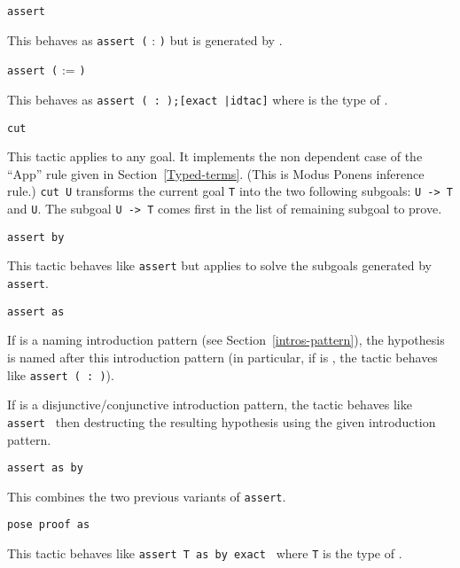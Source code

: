 \begin{Variants}

\item{\tt assert {\form}}
  
  This behaves as {\tt assert (} {\ident} : {\form} {\tt )} but
  {\ident} is generated by {\Coq}.

\item{\tt assert (} {\ident} := {\term} {\tt )}
  
  This behaves as {\tt assert ({\ident} : {\type});[exact
    {\term}|idtac]} where {\type} is the type of {\term}.

\item {\tt cut {\form}} 
  
  This tactic applies to any goal. It implements the non dependent
  case of the ``App'' rule given in
  Section~\ref{Typed-terms}. (This is Modus Ponens inference rule.)
  {\tt cut U} transforms the current goal \texttt{T} into the two
  following subgoals: {\tt U -> T} and \texttt{U}.  The subgoal {\tt U
    -> T} comes first in the list of remaining subgoal to prove.

\item \texttt{assert {\form} by {\tac}}
  
  This tactic behaves like \texttt{assert} but applies {\tac}
  to solve the subgoals generated by \texttt{assert}.

\item \texttt{assert {\form} as {\intropattern}}

  If {\intropattern} is a naming introduction pattern (see
  Section~\ref{intros-pattern}), the hypothesis is named after this
  introduction pattern (in particular, if {\intropattern} is {\ident},
  the tactic behaves like \texttt{assert ({\ident} : {\form})}).

  If {\intropattern} is a disjunctive/conjunctive introduction
  pattern, the tactic behaves like \texttt{assert {\form}} then destructing the
  resulting hypothesis using the given introduction pattern.

\item \texttt{assert {\form} as {\intropattern} by {\tac}}

  This combines the two previous variants of {\tt assert}.

\item \texttt{pose proof {\term} as {\intropattern}}

  This tactic behaves like \texttt{assert T as {\intropattern} by
  exact {\term}} where \texttt{T} is the type of {\term}.


\end{Variants}
